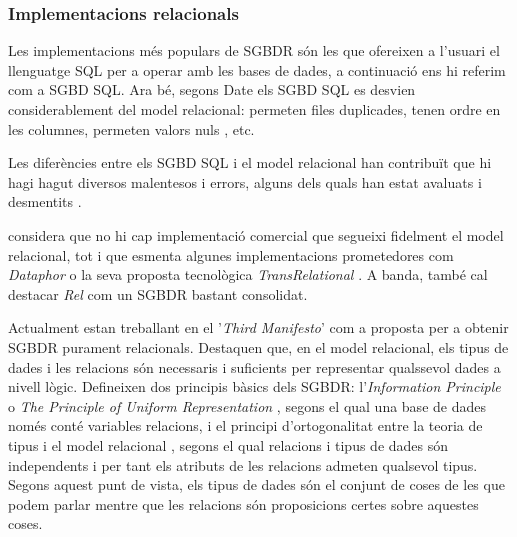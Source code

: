 \subsubsection{Implementacions relacionals}


\todo{}

 Les implementacions més populars de SGBDR són les que
ofereixen a l'usuari el llenguatge SQL per a operar amb les bases de
dades, a continuació ens hi referim com a SGBD SQL.  Ara bé, segons
Date els SGBD SQL es desvien considerablement del model relacional:
permeten files duplicades, tenen ordre en les columnes, permeten
valors nuls \parencite{date08:nulls}, etc.

Les diferències entre els SGBD SQL i el model relacional han
contribuït que hi hagi hagut diversos malentesos i errors, alguns dels
quals han estat avaluats i desmentits \parencite{dbdebunk,date06}.
  

\textcite[cap.~2]{date06} %
considera que no hi cap implementació comercial que segueixi fidelment
el model relacional, tot i que esmenta algunes implementacions
prometedores com \emph{Dataphor} o la seva proposta tecnològica
\emph{TransRelational} \parencite{date:transrelational}. A banda,
també cal destacar \emph{Rel} \parencite{rel} com un SGBDR bastant
consolidat.



Actualment \textcite{date:thethirdmanifesto} estan treballant en el
'\emph{Third Manifesto}' com a proposta per a obtenir SGBDR purament
relacionals. Destaquen que, en el model relacional, els tipus de dades
i les relacions són necessaris i suficients per representar qualssevol
dades a nivell lògic. %
Defineixen dos principis bàsics dels SGBDR: l'\emph{Information
  Principle} o \emph{The Principle of Uniform
  Representation} \parencite{date:dictionary}, segons el qual una base
de dades només conté variables relacions, i el principi
d'ortogonalitat entre la teoria de tipus i el model
relacional \parencite[cap.~6]{date06}, segons el qual relacions i
tipus de dades són independents i per tant els atributs de les
relacions admeten qualsevol tipus.  Segons aquest punt de vista, els
tipus de dades són el conjunt de coses de les que podem parlar mentre que les
relacions són proposicions certes sobre aquestes coses.

